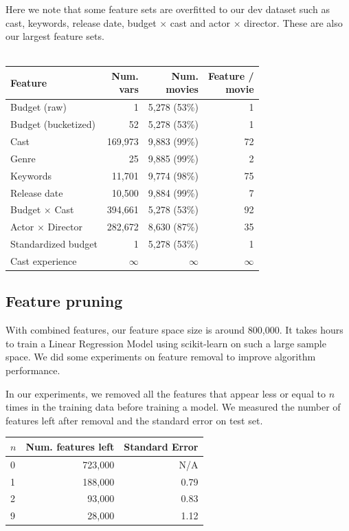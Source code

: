 \documentclass[journal]{IEEEtran}
\begin{document}
\par Here we note that some feature sets are overfitted to our dev dataset such as
cast, keywords, release date, budget $\times$ cast and actor $\times$ director.
These are also our largest feature sets.\\
\\
\begin{tabular}{|l| r r r|} %
\hline
Feature             & \shortstack[c]{Num.\\vars} & \shortstack[c]{Num.\\movies} & \shortstack[c]{Feature / \\ movie}  \\ [0.5ex] %
\hline
Budget (raw)        & 1 & 5,278 (53\%) & 1 \\ %
Budget (bucketized) & 52 & 5,278 (53\%) & 1 \\
Cast                & 169,973 & 9,883 (99\%) & 72 \\
Genre               & 25 & 9,885 (99\%) & 2 \\
Keywords            & 11,701 & 9,774 (98\%) & 75 \\
Release date        & 10,500 & 9,884 (99\%) & 7 \\
\hline
Budget $\times$ Cast & 394,661 & 5,278 (53\%) & 92 \\
Actor $\times$ Director & 282,672 & 8,630 (87\%) & 35 \\
\hline
Standardized budget & 1 & 5,278 (53\%) & 1 \\
Cast experience & $\infty$ & $\infty$ & $\infty$ \\
\hline %
\end{tabular}

\subsection{Feature pruning}
With combined features, our feature space size is around 800,000. It takes hours to train a Linear Regression Model using scikit-learn \cite{scikit} on such a large sample space. We did some experiments on feature removal to improve algorithm performance.
\par In our experiments, we removed all the features that appear less or equal to $n$ times in the training data before training a model. We measured the number of features left after removal and the standard error on test set.\\
\begin{center}
\begin{tabular}{|l| r r|} %
\hline
$n$ & Num. features left & Standard Error  \\ [0.5ex] %
\hline
0 & 723,000 & N/A \\
1 & 188,000 & 0.79 \\
2 & 93,000  & 0.83 \\
9 & 28,000  & 1.12 \\
\hline %
\end{tabular}
\end{center}
\smallskip
\end{document}
